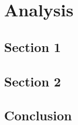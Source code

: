 

\chapter{Analysis}
\label{chap:analysis}

\lipsum[4]

\minitoc
\newpage

\section{Section 1}

\lipsum[5-6]

\section{Section 2}

\lipsum[7-8]

\section{Conclusion}

\lipsum[9-10]
